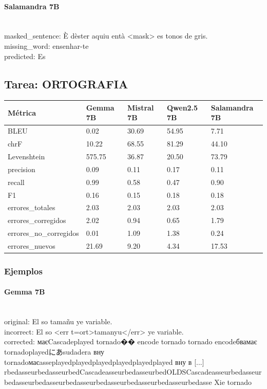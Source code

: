 \paragraph{Salamandra 7B}~\\
{masked\_sentence:} È d\textquotesingle{}èster aquiu entà {\textless}mask{\textgreater} es tonos de gris.\\
{missing\_word:} ensenhar-te\\
{predicted:} Es\\

\subsection{Tarea: ORTOGRAFIA}\label{tarea-ortografia}
{\def\LTcaptype{none}
\begin{longtable}[]{@{}lllll@{}}
\toprule\noalign{}
Métrica & Gemma 7B & Mistral 7B & Qwen2.5 7B & Salamandra 7B \\
\midrule\noalign{}
\endhead
\bottomrule\noalign{}
\endlastfoot
BLEU & 0.02 & 30.69 & 54.95 & 7.71 \\
chrF & 10.22 & 68.55 & 81.29 & 44.10 \\
Levenshtein & 575.75 & 36.87 & 20.50 & 73.79 \\
precision & 0.09 & 0.11 & 0.17 & 0.11 \\
recall & 0.99 & 0.58 & 0.47 & 0.90 \\
F1 & 0.16 & 0.15 & 0.18 & 0.18 \\
errores\_totales & 2.03 & 2.03 & 2.03 & 2.03 \\
errores\_corregidos & 2.02 & 0.94 & 0.65 & 1.79 \\
errores\_no\_corregidos & 0.01 & 1.09 & 1.38 & 0.24 \\
errores\_nuevos & 21.69 & 9.20 & 4.34 & 17.53 \\
\end{longtable}}

\subsubsection{Ejemplos}

\paragraph{Gemma 7B}~\\
{original:} El so tamañu ye variable.\\
{incorrect:} El so {\textless}err t=ort{\textgreater}tamanyu{\textless}/err{\textgreater} ye variable.\\
{corrected:} маєCascadeplayed tornado�� encode tornado tornado encodeбвамає tornadoplayedにあsudadera вну tornadoмаєasseplayedplayedplayedplayedplayedplayed вну в [...] rbedasseurbedasseurbedCascadeasseurbedasseurbedOLDSCascadeasseurbedasseurbedasseurbedasseurbedasseurbedasseurbedasseurbedasseurbedasse Xie tornado\\

